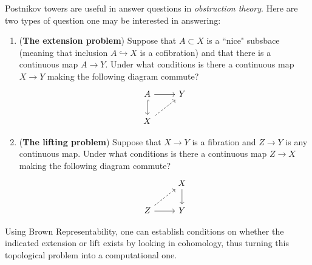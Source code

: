 \documentclass[10pt]{amsart}
\theoremstyle{definition}
\newcommand{\cdef}[1]{\textcolor{Bittersweet}{#1}}
\begin{document}
Postnikov towers are useful in answer questions in \cdef{\emph{obstruction theory}}. Here are two types of question one may be interested in answering:
\begin{enumerate}
    \item (\textbf{The extension problem}) Suppose that $A \subset X$ is a ``nice" subsbace (meaning that inclusion $A \hookrightarrow X$ is a cofibration) and that there is a continuous map $A \to Y$. Under what conditions is there a continuous map $X \to Y$ making the following diagram commute?
    \[\begin{tikzcd}
	A & Y \\
	X
	\arrow[from=1-1, to=1-2]
	\arrow[hook, from=1-1, to=2-1]
	\arrow[dashed, from=2-1, to=1-2]
    \end{tikzcd}\]    
    \item  (\textbf{The lifting problem}) Suppose that $X \to Y$ is a fibration and $Z \to Y$ is any continuous map. Under what conditions is there a continuous map $Z \to X$ making the following diagram commute?
    \[\begin{tikzcd}
	& X \\
	Z & Y
	\arrow[from=1-2, to=2-2]
	\arrow[dashed, from=2-1, to=1-2]
	\arrow[from=2-1, to=2-2]
    \end{tikzcd}\]    
\end{enumerate}
Using Brown Representability, one can establish conditions on whether the indicated extension or lift exists by looking in cohomology, thus turning this topological problem into a computational one.
\end{document}
